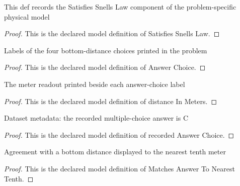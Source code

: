 \begin{definition}
  \label{def:physics:phyx-mini-0135:phyxminiproblems-problemphyxmini0135-satisfiessnellslaw}
  This def records the Satisfies Snells Law component of the problem-specific physical model
\end{definition}
\begin{proof}
  This is the declared model definition of Satisfies Snells Law.
\end{proof}
\begin{definition}
  \label{def:physics:phyx-mini-0135:phyxminiproblems-problemphyxmini0135-answerchoice}
  Labels of the four bottom-distance choices printed in the problem
\end{definition}
\begin{proof}
  This is the declared model definition of Answer Choice.
\end{proof}
\begin{definition}
  \label{def:physics:phyx-mini-0135:phyxminiproblems-problemphyxmini0135-answerchoice-distanceinmeters}
  The meter readout printed beside each answer-choice label
\end{definition}
\begin{proof}
  This is the declared model definition of distance In Meters.
\end{proof}
\begin{definition}
  \label{def:physics:phyx-mini-0135:phyxminiproblems-problemphyxmini0135-recordedanswerchoice}
  Dataset metadata: the recorded multiple-choice answer is C
\end{definition}
\begin{proof}
  This is the declared model definition of recorded Answer Choice.
\end{proof}
\begin{definition}
  \label{def:physics:phyx-mini-0135:phyxminiproblems-problemphyxmini0135-matchesanswertonearesttenth}
  Agreement with a bottom distance displayed to the nearest tenth meter
\end{definition}
\begin{proof}
  This is the declared model definition of Matches Answer To Nearest Tenth.
\end{proof}
